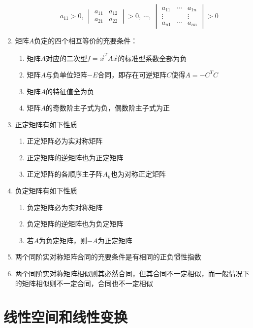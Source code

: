 \documentclass[12pt,a4paper,UTF8]{book}
\begin{document}
\begin{enumerate}
\begin{enumerate}
\[a_{11}>0,\ \begin{vmatrix}a_{11}&a_{12}\\a_{21}&a_{22}\end{vmatrix}>0,\ \cdots,\ \begin{vmatrix}a_{11}&\cdots&a_{1n}\\\vdots&\ &\vdots\\a_{n1}&\cdots&a_{nn}\end{vmatrix}>0\]
\end{enumerate}
\item 矩阵$A$负定的四个相互等价的充要条件：
\begin{enumerate}
\item 矩阵$A$对应的二次型$f=\vec{x}^TA\vec{x}$的标准型系数全部为负
\item 矩阵$A$与负单位矩阵$-E$合同，即存在可逆矩阵$C$使得$A=-C^TC$
\item 矩阵$A$的特征值全为负
\item 矩阵$A$的奇数阶主子式为负，偶数阶主子式为正
\end{enumerate}
\item 正定矩阵有如下性质
\begin{enumerate}
\item 正定矩阵必为实对称矩阵
\item 正定矩阵的逆矩阵也为正定矩阵
\item 正定矩阵的各顺序主子阵$A_k$也为对称正定矩阵
\end{enumerate}
\item 负定矩阵有如下性质
\begin{enumerate}
\item 负定矩阵必为实对称矩阵
\item 负定矩阵的逆矩阵也为负定矩阵
\item 若$A$为负定矩阵，则$-A$为正定矩阵
\end{enumerate}
\item 两个同阶实对称矩阵合同的充要条件是有相同的正负惯性指数
\item 两个同阶实对称矩阵相似则其必然合同，但其合同不一定相似，而一般情况下的矩阵相似则不一定合同，合同也不一定相似
\end{enumerate}


\section{线性空间和线性变换}
\end{document}
